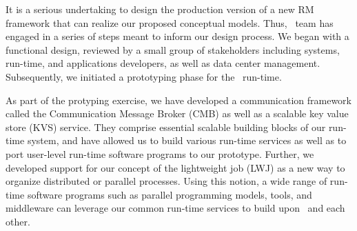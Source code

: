 It is a serious undertaking 
to design the production version of a new 
RM framework that can realize our proposed conceptual models.
Thus, \flux\ team has engaged in a series of steps
meant to inform our design process. 
We began with a functional design, reviewed
by a small group of stakeholders including 
systems, run-time, and applications developers,
as well as data center management.
Subsequently, we initiated a prototyping phase for the \flux\ run-time.


%
As part of the protyping exercise, we have developed a communication framework 
called the Communication Message Broker (CMB) 
as well as a scalable key value store (KVS) service.
They comprise essential scalable building blocks of our run-time system, 
and have allowed us to build various run-time services as well as
to port user-level run-time software programs to our prototype.
Further, we developed support for our concept of the lightweight 
job (LWJ) as a new way to organize distributed or parallel processes.
Using this notion, a wide range of run-time software
programs such as parallel programming models,
tools, and middleware can leverage our common run-time services 
to build upon \flux\ and each other.

\ifcomments
{}
\fi
